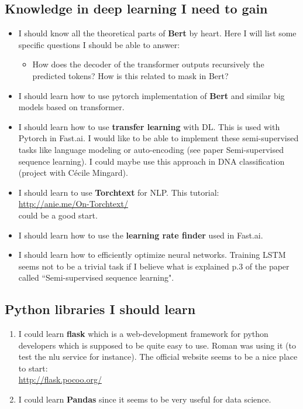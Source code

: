 \documentclass[11pt,a4paper]{article}
\begin{document}
\subsection{Knowledge in deep learning I need to gain}
\begin{itemize}
\item I should know all the theoretical parts of \textbf{Bert} by heart. Here I will list some specific questions I should be able to answer:
\begin{itemize}
\item How does the decoder of the transformer outputs recursively the predicted tokens? How is this related to mask in Bert?
\end{itemize}
\item I should learn how to use pytorch implementation of \textbf{Bert} and similar big models based on transformer.
\item I should learn how to use \textbf{transfer learning} with DL. This is used with Pytorch in Fast.ai. I would like to be able to implement these semi-supervised tasks like language modeling or auto-encoding (see paper Semi-supervised sequence learning). I could maybe use this approach in DNA classification (project with Cécile Mingard).
\item I should learn to use \textbf{Torchtext} for NLP. This tutorial:\\
\url{http://anie.me/On-Torchtext/}\\
could be a good start.
\item I should learn how to use the \textbf{learning rate finder} used in Fast.ai.
\item I should learn how to efficiently optimize neural networks. Training LSTM seems not to be a trivial task if I believe what is explained p.3 of the paper called ``Semi-supervised sequence learning".
\end{itemize}

\subsection{Python libraries I should learn}
\begin{enumerate}
\item I could learn \textbf{flask} which is  a web-development framework for python developers which is supposed to be quite easy to use. Roman was using it (to test the nlu service for instance). The official website seems to be a nice place to start:\\
\url{http://flask.pocoo.org/}
\item I could learn \textbf{Pandas} since it seems to be very useful for data science.
\end{enumerate}
\end{document}
